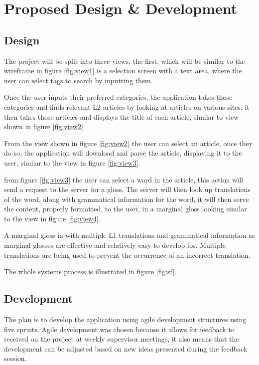 \chapter{Proposed Design \& Development}
\section{Design}
The project will be split into three views, the first, which will be similar to the wireframe in figure \ref{fig:view1} is a selection screen with a text area, where the user can select tags to search by inputting them.



Once the user inputs their preferred categories, the application takes those categories and finds relevant L2 articles by looking at articles on various sites, it then takes those articles and displays the title of each article, similar to view shown in figure \ref{fig:view2}



From the view shown in figure \ref{fig:view2} the user can select an article, once they do so, the application will download and parse the article, displaying it to the user, similar to the view in figure \ref{fig:view3}.



from figure \ref{fig:view3} the user can select a word in the article, this action will send a request to the server for a gloss. The server will then look up translations of the word, along with grammatical information for the word, it will then serve the content, properly formatted, to the user, in a marginal gloss looking similar to the view in figure \ref{fig:view4}.



A marginal gloss in with multiple L1 translations and grammatical information as marginal glosses are effective \cite{abuseileek2008} and relatively easy to develop for. Multiple translations are being used to prevent the occurrence of an incorrect translation. 

The whole systems process is illustrated in figure \ref{fig:sf}.
	


\section{Development}

The plan is to develop the application using agile development structures using five sprints. Agile development was chosen because it allows for feedback to received on the project at weekly supervisor meetings, it also means that the development can be adjusted based on new ideas presented during the feedback session.

